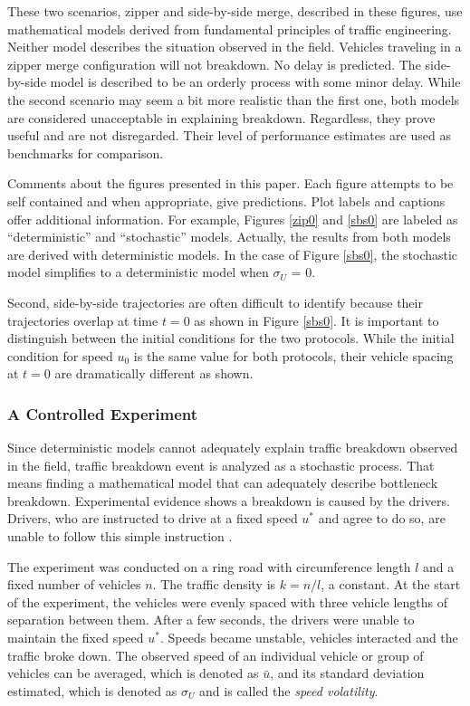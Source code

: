 \documentclass[Proceedings]{ascelike}
\begin{document}
These two scenarios, zipper and side-by-side merge, described in these figures, use  mathematical models derived from fundamental principles of traffic engineering. Neither model describes the situation observed in the field.  Vehicles traveling in a zipper merge configuration will not breakdown. No delay is predicted.    The side-by-side model is described to be  an orderly process with some minor delay. While the second scenario may seem a bit more realistic than the first one, both models are considered unacceptable in explaining breakdown. Regardless, they prove useful and are not disregarded. Their level of performance estimates are used as benchmarks for comparison. 

Comments about the figures presented in this paper. Each figure attempts to be self contained and when appropriate, give predictions. Plot labels and captions offer additional information. For example, Figures \ref{zip0} and \ref{sbs0} are labeled as ``deterministic'' and ``stochastic'' models. Actually, the results from both models are derived with deterministic models. In the case of Figure  \ref{sbs0}, the stochastic model simplifies to a deterministic model when $\sigma_U$ = 0.

Second, side-by-side trajectories are often difficult to identify because their trajectories overlap at time $t = 0$ as  shown in Figure  \ref{sbs0}. It is important to distinguish  between the initial conditions for the two protocols. While the initial condition for speed $u_0$ is the same value for both protocols, their vehicle spacing at $t = 0$ are dramatically different as shown.

\subsubsection{A Controlled Experiment}

Since deterministic models cannot  adequately explain traffic breakdown observed in the field,  traffic breakdown event is analyzed as a stochastic process.   That means finding a  mathematical model that can adequately describe bottleneck breakdown. Experimental evidence shows  a breakdown is caused by  the drivers. Drivers, who are instructed to drive at a fixed speed $u^*$ and agree to do so, are unable to follow this simple instruction \cite{1367-2630-10-3-033001}. 

The experiment was conducted on a ring  road with circumference length $l$ and  a fixed number of  vehicles  $n$. The traffic density is $k = n/l$, a constant. At the start of the experiment, the vehicles were evenly spaced with three vehicle lengths of separation between them. After a few seconds, the drivers were unable to maintain the fixed speed $u^*$. Speeds became unstable, vehicles interacted and the traffic broke down.  The observed speed of an individual vehicle or group of vehicles can be averaged, which is denoted as $\bar{u}$, and its standard deviation estimated, which is denoted as $\sigma_U$ and is called the \emph{speed volatility}.  
\end{document}
